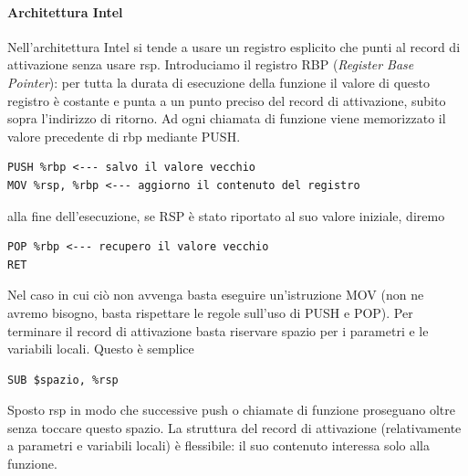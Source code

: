 \documentclass[11pt]{report}
\theoremstyle{definition}
\begin{document}
\paragraph{Architettura Intel} Nell'architettura Intel si tende a usare un registro esplicito che punti al record di attivazione senza usare rsp. Introduciamo il registro RBP (\emph{Register Base Pointer}): per tutta la durata di esecuzione della funzione il valore di questo registro è costante e punta a un punto preciso del record di attivazione, subito sopra l'indirizzo di ritorno. Ad ogni chiamata di funzione viene memorizzato il valore precedente di rbp mediante PUSH.
\begin{verbatim}
PUSH %rbp <--- salvo il valore vecchio 
MOV %rsp, %rbp <--- aggiorno il contenuto del registro
\end{verbatim}
alla fine dell'esecuzione, se RSP è stato riportato al suo valore iniziale, diremo
\begin{verbatim}
POP %rbp <--- recupero il valore vecchio 
RET
\end{verbatim}
Nel caso in cui ciò non avvenga basta eseguire un'istruzione MOV (non ne avremo bisogno, basta rispettare le regole sull'uso di PUSH e POP). Per terminare il record di attivazione basta riservare spazio per i parametri e le variabili locali. Questo è semplice
\begin{verbatim}
SUB $spazio, %rsp
\end{verbatim}
Sposto rsp in modo che successive push o chiamate di funzione proseguano oltre senza toccare questo spazio. La struttura del record di attivazione (relativamente a parametri e variabili locali) è flessibile: il suo contenuto interessa solo alla funzione.
\end{document}
